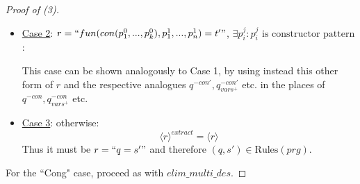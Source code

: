 \documentclass[11pt]{article} %
\begin{document}
\begin{proof}[Proof of (3)]
\begin{enumerate}
\begin{itemize}
\begin{enumerate}
\item $n_c = 1$:
\begin{equation*}
\langle `` q' = t' ", H \rangle^{extract} = \langle `` q'^{-con} = hname (q'^{-con}_{vars^+}) ", \{\big\langle hsig, heqn \big\rangle\} \cup H \rangle^{extract}
\end{equation*}
with $hname, hsig, heqn$ as in the definition of $extract$. Since $q'$ contains only one constructor pattern, $q'^{-con}$ contains no constructor pattern. It follows that:
\begin{equation*}
\langle `` q' = t' ", H \rangle^{extract} = \big\langle `` q'^{-con} = hname (q'^{-con}_{vars^+}) ", \{\big\langle hsig, heqn \big\rangle\} \cup H \big\rangle
\end{equation*}
 Neither of the two equations outside of $H$ in $\langle r, H \rangle^{extract}$ is $`` q = s' "$, since they both contain function names not present in $prg$.

\item $n_c = n'_c + 1$, $n'_c \geq 0$:
\begin{equation*}
\langle `` q' = t' ", H \rangle^{extract} = \langle `` q'^{-con} = hname (q'^{-con}_{vars^+}) ", \{\big\langle hsig, heqn \big\rangle\} \cup H \rangle^{extract}
\end{equation*}
with $hname, hsig, heqn$ as in the definition of $extract$. Since $q'^{-con}$ contains one less constructor pattern than $q'$, it contains $n'_c$ such patterns. Applying the induction hypothesis we have that $\langle r, H \rangle^{extract}$ doesn't contain $`` q = s' "$ outside of $\{ \big\langle hsig, heqn \big\rangle \} \cup H$. The only remaining equation outside of $H$ that could be $`` q = s' "$ is defined by $heqn$ to contain a function name not present in $prg$. Thus this equation can't be $`` q = s' "$, either.

\end{enumerate}

\item \underline{Case 2}:  $r = `` fun(con(p^0_1, ..., p^0_k), p^1_1, ..., p^1_n) = t' " $, $\exists p^j_i: p^j_i \textrm{ is constructor pattern}$:

This case can be shown analogously to Case 1, by using instead this other form of $r$ and the respective analogues $q^{-con'}, q^{-con'}_{vars^+}$ etc. in the places of $q^{-con}, q^{-con}_{vars^+}$ etc.

\item \underline{Case 3}: otherwise:
\begin{equation*}
\langle r \rangle^{extract} = \big\langle r \big\rangle
\end{equation*}
Thus it must be $r = `` q = s' "$ and therefore $(q, s') \in \textrm{Rules}(prg)$.

\end{itemize}

\end{enumerate}

For the ``Cong" case, proceed as with $elim\_multi\_des$.

\end{proof}
\end{document}
